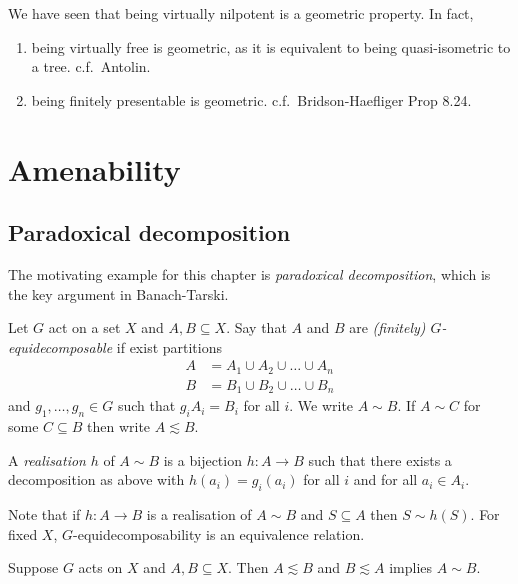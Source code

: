 \documentclass[a4paper]{article}
\begin{document}
\begin{remark}
  We have seen that being virtually nilpotent is a geometric property. In fact,
  \begin{enumerate}
  \item being virtually free is geometric, as it is equivalent to being quasi-isometric to a tree. c.f.\ Antolin.
  \item being finitely presentable is geometric. c.f.\ Bridson-Haefliger Prop 8.24.
  \end{enumerate}
\end{remark}

\section{Amenability}

\subsection{Paradoxical decomposition}

The motivating example for this chapter is \emph{paradoxical decomposition}, which is the key argument in Banach-Tarski.

\begin{definition}[equidecomposable]
  Let \(G\) act on a set \(X\) and \(A, B \subseteq X\). Say that \(A\) and \(B\) are \emph{(finitely) \(G\)-equidecomposable} if exist partitions
  \begin{align*}
    A &= A_1 \cup A_2 \cup \dots \cup A_n \\
    B &= B_1 \cup B_2 \cup \dots \cup B_n
  \end{align*}
  and \(g_1, \dots, g_n \in G\) such that \(g_i A_i = B_i\) for all \(i\). We write \(A \sim B\). If \(A \sim C\) for some \(C \subseteq B\) then write \(A \lesssim B\).

  A \emph{realisation} \(h\) of \(A \sim B\) is a bijection \(h: A \to B\) such that there exists a decomposition as above with \(h(a_i) = g_i(a_i)\) for all \(i\) and for all \(a_i \in A_i\).
\end{definition}

Note that if \(h: A \to B\) is a realisation of \(A \sim B\) and \(S \subseteq A\) then \(S \sim h(S)\). For fixed \(X\), \(G\)-equidecomposability is an equivalence relation.

\begin{theorem}
  Suppose \(G\) acts on \(X\) and \(A, B \subseteq X\). Then \(A \lesssim B\) and \(B \lesssim A\) implies \(A \sim B\).
\end{theorem}
\end{document}
